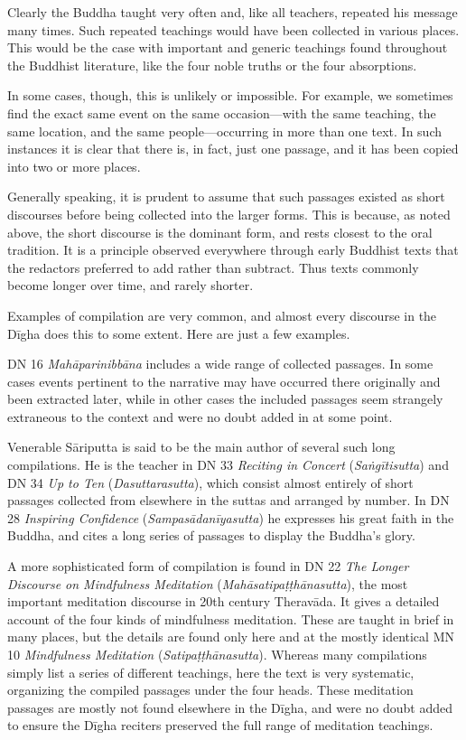 \documentclass[12pt,openany]{book}%
\begin{document}
Clearly the Buddha taught very often and, like all teachers, repeated his message many times. Such repeated teachings would have been collected in various places. This would be the case with important and generic teachings found throughout the Buddhist literature, like the four noble truths or the four absorptions.

In some cases, though, this is unlikely or impossible. For example, we sometimes find the exact same event on the same occasion—with the same teaching, the same location, and the same people—occurring in more than one text. In such instances it is clear that there is, in fact, just one passage, and it has been copied into two or more places.

Generally speaking, it is prudent to assume that such passages existed as short discourses before being collected into the larger forms. This is because, as noted above, the short discourse is the dominant form, and rests closest to the oral tradition. It is a principle observed everywhere through early Buddhist texts that the redactors preferred to add rather than subtract. Thus texts commonly become longer over time, and rarely shorter.

Examples of compilation are very common, and almost every discourse in the \textsanskrit{Dīgha} does this to some extent. Here are just a few examples.

DN 16 \textit{\textsanskrit{Mahāparinibbāna}} includes a wide range of collected passages. In some cases events pertinent to the narrative may have occurred there originally and been extracted later, while in other cases the included passages seem strangely extraneous to the context and were no doubt added in at some point.

Venerable \textsanskrit{Sāriputta} is said to be the main author of several such long compilations. He is the teacher in DN 33 \textit{Reciting in Concert} (\textit{\textsanskrit{Saṅgītisutta}}) and DN 34 \textit{Up to Ten} (\textit{Dasuttarasutta}), which consist almost entirely of short passages collected from elsewhere in the suttas and arranged by number. In DN 28 \textit{Inspiring Confidence} (\textit{\textsanskrit{Sampasādanīyasutta}}) he expresses his great faith in the Buddha, and cites a long series of passages to display the Buddha’s glory.

A more sophisticated form of compilation is found in DN 22 \textit{The Longer Discourse on Mindfulness Meditation} (\textit{\textsanskrit{Mahāsatipaṭṭhānasutta}}), the most important meditation discourse in 20th century \textsanskrit{Theravāda}. It gives a detailed account of the four kinds of mindfulness meditation. These are taught in brief in many places, but the details are found only here and at the mostly identical MN 10 \textit{Mindfulness Meditation} (\textit{\textsanskrit{Satipaṭṭhānasutta}}). Whereas many compilations simply list a series of different teachings, here the text is very systematic, organizing the compiled passages under the four heads. These meditation passages are mostly not found elsewhere in the \textsanskrit{Dīgha}, and were no doubt added to ensure the \textsanskrit{Dīgha} reciters preserved the full range of meditation teachings.
\end{document}
